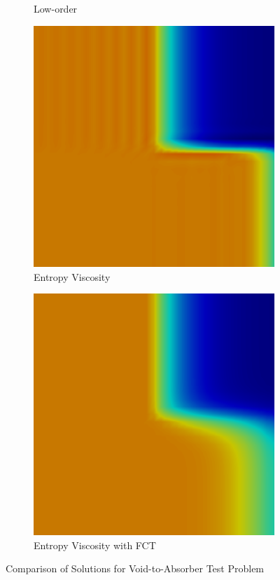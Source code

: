 \begin{figure}[h]
\begin{subfigure}{0.3\textwidth}
      \caption{Low-order}
   \end{subfigure}
   \begin{subfigure}{0.3\textwidth}
      \includegraphics[width=\textwidth]{void_to_absorber/EV.png}
      \caption{Entropy Viscosity}
   \end{subfigure}
   \begin{subfigure}{0.3\textwidth}
      \includegraphics[width=\textwidth]{void_to_absorber/EVFCT.png}
      \caption{Entropy Viscosity with FCT}
   \end{subfigure}
   \caption{Comparison of Solutions for Void-to-Absorber Test Problem}
   \label{fig:void_to_absorber_2D}
\end{figure}
